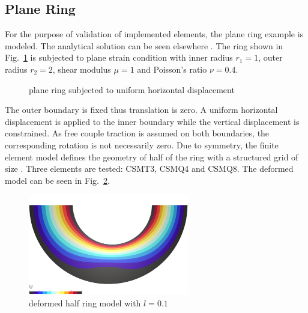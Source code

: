 \documentclass[3p,sort&compress,11pt,fleqn]{elsarticle}
\newcommand*{\figref}[1]{Fig.~\ref{#1}}
\begin{document}
\subsection{Plane Ring}
For the purpose of validation of implemented elements, the plane ring example is modeled. The analytical solution can be seen elsewhere \citep{Hadjesfandiari2011}. The ring shown in \figref{fig:ring} is subjected to plane strain condition with inner radius $r_1=1$, outer radius $r_2=2$, shear modulus $\mu=1$ and Poisson's ratio $\nu=0.4$.
\begin{figure}[htb]
\centering\footnotesize
{}
\caption{plane ring subjected to uniform horizontal displacement}\label{fig:ring}
\end{figure}
The outer boundary is fixed thus translation is zero. A uniform horizontal displacement is applied to the inner boundary while the vertical displacement is constrained. As free couple traction is assumed on both boundaries, the corresponding rotation is not necessarily zero. Due to symmetry, the finite element model defines the geometry of half of the ring with a structured grid of size . Three elements are tested: CSMT3, CSMQ4 and CSMQ8. The deformed model can be seen in \figref{fig:deformed_ring}.
\begin{figure}[htb]
\centering\footnotesize
\includegraphics[width=7cm]{MODEL/RING/MODEL}
\caption{deformed half ring model with $l=\num{0.1}$}\label{fig:deformed_ring}
\end{figure}
\end{document}
